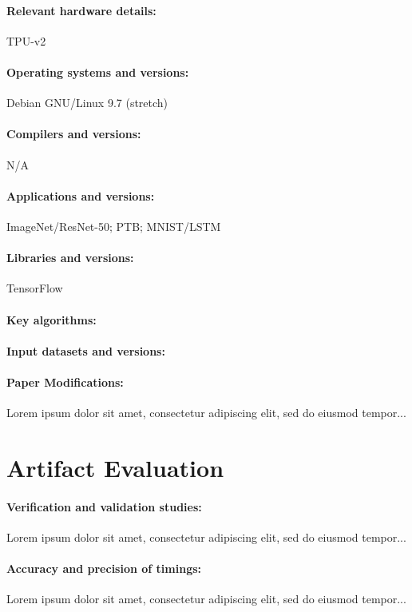 \documentclass[sigconf,nonacm=true]{acmart}
\begin{document}
\paragraph{Relevant hardware details:} TPU-v2
\paragraph{Operating systems and versions:} Debian GNU/Linux 9.7 (stretch)
\paragraph{Compilers and versions:} N/A
\paragraph{Applications and versions:} ImageNet/ResNet-50; PTB; MNIST/LSTM
\paragraph{Libraries and versions:}  TensorFlow
\paragraph{Key algorithms:} 
\paragraph{Input datasets and versions:} 
\paragraph{Paper Modifications:}
Lorem ipsum dolor sit amet, consectetur adipiscing elit, sed do eiusmod tempor...

\section*{ Artifact Evaluation}

\paragraph{Verification and validation studies:}
Lorem ipsum dolor sit amet, consectetur adipiscing elit, sed do eiusmod tempor...

\paragraph{Accuracy and precision of timings:} 
Lorem ipsum dolor sit amet, consectetur adipiscing elit, sed do eiusmod tempor...
\end{document}
